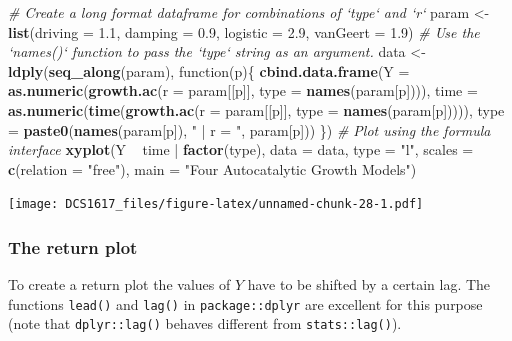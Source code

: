 \documentclass[]{book}
\newenvironment{Shaded}{\begin{snugshade}}{\end{snugshade}}
\newcommand{\KeywordTok}[1]{\textcolor[rgb]{0.13,0.29,0.53}{\textbf{{#1}}}}
\newcommand{\DataTypeTok}[1]{\textcolor[rgb]{0.13,0.29,0.53}{{#1}}}
\newcommand{\FloatTok}[1]{\textcolor[rgb]{0.00,0.00,0.81}{{#1}}}
\newcommand{\StringTok}[1]{\textcolor[rgb]{0.31,0.60,0.02}{{#1}}}
\newcommand{\CommentTok}[1]{\textcolor[rgb]{0.56,0.35,0.01}{\textit{{#1}}}}
\newcommand{\NormalTok}[1]{{#1}}
\begin{document}
\begin{Shaded}
\begin{Highlighting}[]
\CommentTok{# Create a long format dataframe for combinations of `type` and `r`}
\NormalTok{param <-}\StringTok{ }\KeywordTok{list}\NormalTok{(}\DataTypeTok{driving  =} \FloatTok{1.1}\NormalTok{,}
              \DataTypeTok{damping  =} \FloatTok{0.9}\NormalTok{,}
              \DataTypeTok{logistic =} \FloatTok{2.9}\NormalTok{,}
              \DataTypeTok{vanGeert =} \FloatTok{1.9}\NormalTok{)}
\CommentTok{# Use the `names()` function to pass the `type` string as an argument.}
\NormalTok{data <-}\StringTok{ }\KeywordTok{ldply}\NormalTok{(}\KeywordTok{seq_along}\NormalTok{(param), function(p)\{}
    \KeywordTok{cbind.data.frame}\NormalTok{(}\DataTypeTok{Y    =} \KeywordTok{as.numeric}\NormalTok{(}\KeywordTok{growth.ac}\NormalTok{(}\DataTypeTok{r =} \NormalTok{param[[p]], }\DataTypeTok{type =} \KeywordTok{names}\NormalTok{(param[p]))),}
                     \DataTypeTok{time =} \KeywordTok{as.numeric}\NormalTok{(}\KeywordTok{time}\NormalTok{(}\KeywordTok{growth.ac}\NormalTok{(}\DataTypeTok{r =} \NormalTok{param[[p]], }\DataTypeTok{type =} \KeywordTok{names}\NormalTok{(param[p])))),}
                     \DataTypeTok{type =} \KeywordTok{paste0}\NormalTok{(}\KeywordTok{names}\NormalTok{(param[p]), }\StringTok{" | r = "}\NormalTok{, param[p]))}
    \NormalTok{\})}
\CommentTok{# Plot using the formula interface}
\KeywordTok{xyplot}\NormalTok{(Y ~}\StringTok{ }\NormalTok{time |}\StringTok{ }\KeywordTok{factor}\NormalTok{(type), }\DataTypeTok{data =} \NormalTok{data, }\DataTypeTok{type =} \StringTok{"l"}\NormalTok{, }\DataTypeTok{scales =} \KeywordTok{c}\NormalTok{(}\DataTypeTok{relation =} \StringTok{"free"}\NormalTok{),}
       \DataTypeTok{main =} \StringTok{"Four Autocatalytic Growth Models"}\NormalTok{)}
\end{Highlighting}
\end{Shaded}

\texttt{[image: DCS1617\_files/figure-latex/unnamed-chunk-28-1.pdf]}

\subsubsection*{The return plot}\label{the-return-plot-1}

To create a return plot the values of \(Y\) have to be shifted by a
certain lag. The functions \texttt{lead()} and \texttt{lag()} in
\texttt{package::dplyr} are excellent for this purpose (note that
\texttt{dplyr::lag()} behaves different from \texttt{stats::lag()}).
\end{document}
